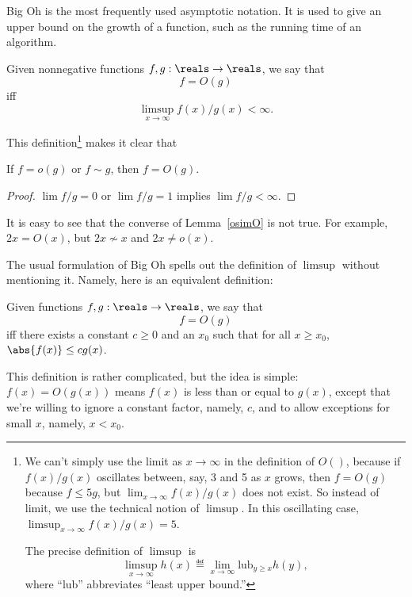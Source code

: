 Big Oh is the most frequently used asymptotic notation.  It is used to
give an upper bound on the growth of a function, such as the running
time of an algorithm.
\begin{definition}
Given nonnegative functions $f, g : \reals \to \reals$, we
say that
\[
f = O(g)
\]
iff
\[
\limsup_{x \rightarrow \infty} f(x)/g(x) < \infty.
\]
\end{definition}
This definition\footnote{We can't simply use the limit as
$x \rightarrow \infty$ in the definition of $O()$, because if
$f(x)/g(x)$ oscillates between, say, 3 and 5 as $x$ grows, then $f =
O(g)$ because $f
\leq 5g$, but $\lim_{x \rightarrow \infty} f(x)/g(x)$ does not exist.
So instead of limit, we use the technical notion of $\limsup$.  In
this oscillating case, $\limsup_{x \rightarrow \infty} f(x)/g(x) = 5$.

The precise definition of $\limsup$ is
\[
\limsup_{x \rightarrow \infty} h(x) \eqdef \lim_{x \rightarrow \infty}
\text{lub}_{y \geq x} h(y),
\]
where ``lub'' abbreviates ``least upper bound.''} makes it clear that
\begin{lemma}\label{osimO}
If $f = o(g)$ or $f \sim g$, then $f = O(g)$.
\end{lemma}
\begin{proof}
$\lim f/g=0$ or $\lim f/g=1$ implies $\lim f/g<\infty$.
\end{proof}

It is easy to see that the converse of Lemma~\ref{osimO} is not true.  For
example, $2x = O(x)$, but $2x \not\sim x$ and $2x \neq o(x)$.

The usual formulation of Big Oh spells out the definition of $\limsup$
without mentioning it.  Namely, here is an equivalent definition:
\begin{definition}\label{def:O}
Given functions $f, g : \reals \to \reals$, we say that
\[
f = O(g)
\]
iff there exists a constant $c \geq 0$ and an $x_0$ such that for all $x \geq
x_0$, $\abs{f(x)} \leq c g(x)$.
\end{definition}

This definition is rather complicated, but the idea is simple: $f(x) =
O(g(x))$ means $f(x)$ is less than or equal to $g(x)$, except that we're
willing to ignore a constant factor, namely, $c$, and to allow exceptions for
small $x$, namely, $x < x_0$.

